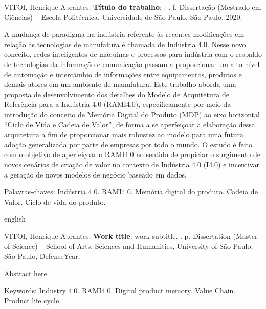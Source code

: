 \documentclass[
	12pt,				%
	oneside,			%
	a4paper,			%
	english,			%
	brazil				%
]{abntex2}
\begin{document}
\setlength{\absparsep}{18pt}	%
\begin{resumo}

	\begin{flushleft}
		VITOI, Henrique Abrantes. \textbf{Título do trabalho}: \imprimirtitulo. \imprimirdata. \pageref{LastPage} f. Dissertação (Mestrado em Ciências) – Escola Politécnica, Universidade de São Paulo, São Paulo, 2020.
	\end{flushleft}

	A mudança de paradigma na indústria referente às recentes modificações em relação às tecnologias de manufatura é chamada de Indústria 4.0. Nesse novo conceito, redes inteligentes de máquinas e processos para indústria com o respaldo de tecnologias da informação e comunicação passam a proporcionar um alto nível de automação e intercâmbio de informações entre equipamentos, produtos e demais atores em um ambiente de manufatura.
	Este trabalho aborda uma proposta de desenvolvimento dos detalhes do Modelo de Arquitetura de Referência para a Indústria 4.0 (RAMI4.0), especificamente por meio da introdução do conceito de Memória Digital do Produto (MDP) ao eixo horizontal ``Ciclo de Vida e Cadeia de Valor'', de forma a se aperfeiçoar a elaboração dessa arquitetura a fim de proporcionar mais robustez ao modelo para uma futura adoção generalizada por parte de empresas por todo o mundo.
	O estudo é feito com o objetivo de aperfeiçoar o RAMI4.0 no sentido de propiciar o surgimento de novos cenários de criação de valor no contexto de Indústria 4.0 (I4.0) e incentivar a geração de novos modelos de negócio baseado em dados.

	Palavras-chaves: Indústria 4.0. RAMI4.0. Memória digital do produto. Cadeia de Valor. Ciclo de vida do produto.
	
\end{resumo}

\begin{resumo}[Abstract]
	\begin{otherlanguage*}{english}

		\begin{flushleft}
			VITOI, Henrique Abrantes. \textbf{Work title}: work subtitle. \imprimirdata. \pageref{LastPage} p. Dissertation (Master of Science) – School of Arts, Sciences and Humanities, University of São Paulo, São Paulo, DefenseYear. 
		\end{flushleft}
		Abstract here

		Keywords: Industry 4.0. RAMI4.0. Digital product memory. Value Chain. Product life cycle. 
	\end{otherlanguage*}
\end{resumo}
\end{document}
